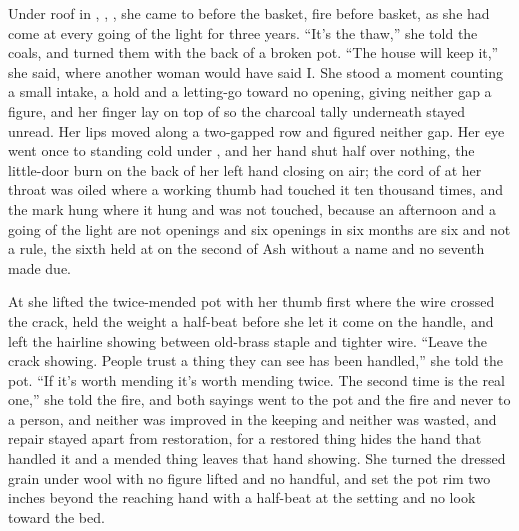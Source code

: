 Under  roof in , , , she came to  before the basket, fire before basket, as she had come at every going of the light for three years. “It's the thaw,” she told the coals, and turned them with the back of a broken pot. “The house will keep it,” she said, where another woman would have said I. She stood a moment counting a small intake, a hold and a letting-go toward no opening, giving neither gap a figure, and her finger lay on top of  so the charcoal tally underneath stayed unread. Her lips moved along a two-gapped row and figured neither gap. Her eye went once to  standing cold under , and her hand shut half over nothing, the little-door burn on the back of her left hand closing on air; the cord of  at her throat was oiled where a working thumb had touched it ten thousand times, and the mark hung where it hung and was not touched, because an afternoon and a going of the light are not openings and six openings in six months are six and not a rule, the sixth held at  on the second of Ash without a name and no seventh made due.

At  she lifted the twice-mended pot with her thumb first where the wire crossed the crack, held the weight a half-beat before she let it come on the handle, and left the hairline showing between old-brass staple and tighter wire. “Leave the crack showing. People trust a thing they can see has been handled,” she told the pot. “If it's worth mending it's worth mending twice. The second time is the real one,” she told the fire, and both sayings went to the pot and the fire and never to a person, and neither was improved in the keeping and neither was wasted, and repair stayed apart from restoration, for a restored thing hides the hand that handled it and a mended thing leaves that hand showing. She turned the dressed grain under wool with no figure lifted and no handful, and set the pot rim two inches beyond the reaching hand with a half-beat at the setting and no look toward the bed.

